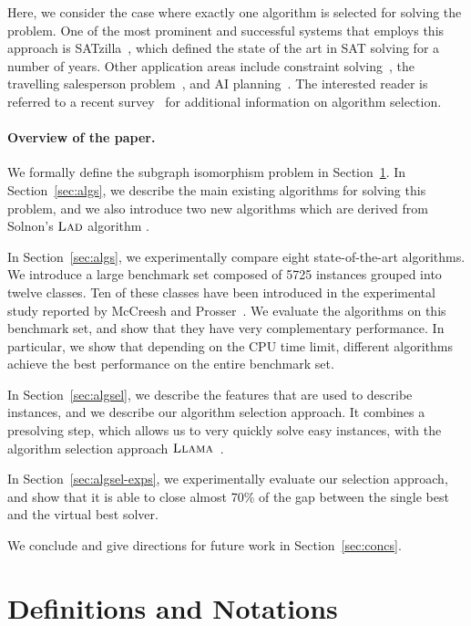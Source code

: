 \documentclass{llncs}
\newcommand{\LAD}{$\textsc{Lad}$\xspace}
\newcommand{\LLAMA}{$\textsc{Llama}$\xspace}
\begin{document}
Here, we consider the case where exactly one algorithm is selected for solving the problem. One of
the most prominent and successful systems that employs this approach is
SATzilla~\cite{xu_satzilla_2008}, which defined the state of the art in SAT solving for a number of
years. Other application areas include constraint solving~\cite{omahony_using_2008}, the travelling
salesperson problem~\cite{kotthoff_improving_2015}, and AI planning~\cite{seipp_learning_2012}.
The interested reader is referred to a recent survey~\cite{kotthoff_algorithm_2014} for additional
information on algorithm selection.

\paragraph{Overview of the paper.}
We formally define the subgraph isomorphism problem in Section~\ref{sec:defs}.
In Section~\ref{sec:algs}, we describe the main existing algorithms for solving
this problem, and we also introduce two new algorithms which are derived from
Solnon's \LAD algorithm \cite{Solnon:2010}.

In Section~\ref{sec:algs}, we experimentally compare eight state-of-the-art
algorithms. We introduce a large benchmark set composed of 5725 instances
grouped into twelve classes. Ten of these classes have been introduced in the
experimental study reported by McCreesh and Prosser~\cite{McCreesh:2015}. We
evaluate the algorithms on this benchmark set, and show that they have very
complementary performance. In particular, we show that depending on the CPU
time limit, different algorithms achieve the best performance on the entire
benchmark set.

In Section~\ref{sec:algsel}, we describe the features that are used to describe
instances, and we describe our algorithm selection approach. It combines a
presolving step, which allows us to very quickly solve easy instances, with the
algorithm selection approach \LLAMA~\cite{kotthoff_llama_2013}.

In Section~\ref{sec:algsel-exps}, we experimentally evaluate our selection
approach, and show that it is able to close almost 70\% of the gap between the
single best and the virtual best solver.

We conclude and give directions for future work in Section~\ref{sec:concs}.



\section{Definitions and Notations}\label{sec:defs}
\end{document}
